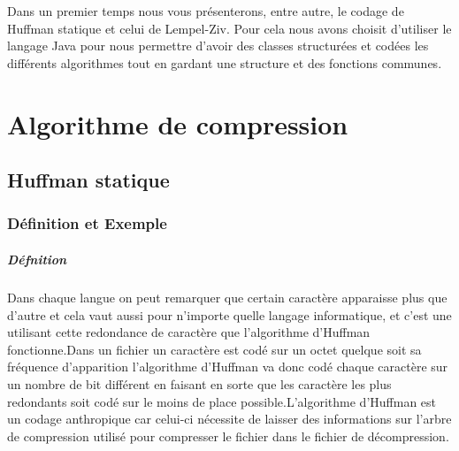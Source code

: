 \documentclass{report}
\begin{document}
Dans un premier temps nous vous présenterons, entre autre, le codage de Huffman statique et celui de Lempel-Ziv. 
Pour cela nous avons choisit d'utiliser le langage Java pour nous permettre d'avoir des classes structurées et codées les différents algorithmes tout en gardant une structure et des fonctions communes.
 \part*{Algorithme de compression}
\chapter*{Huffman statique}
\section*{Définition et Exemple }
\subsubsection*{Défnition}
Dans chaque langue on peut remarquer que certain caractère apparaisse plus que d'autre et cela vaut aussi pour n'importe quelle langage informatique, et c'est une utilisant cette redondance de caractère que l'algorithme d'Huffman fonctionne.Dans un fichier un caractère est codé sur un octet quelque soit sa fréquence d'apparition l'algorithme d'Huffman va donc codé chaque caractère sur un nombre de bit différent en faisant en sorte que les caractère les plus redondants soit codé sur le moins de place possible.L'algorithme d'Huffman est un codage anthropique car celui-ci nécessite de laisser des informations sur l'arbre de compression utilisé pour compresser le fichier dans le fichier de décompression.
\end{document}
